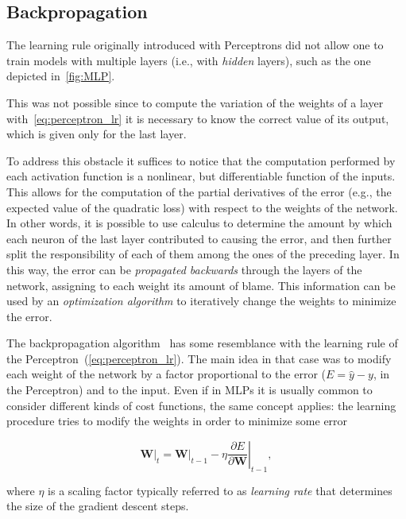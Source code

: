\subsection{Backpropagation}\label{sec:backprop}
The learning rule originally introduced with Perceptrons did not allow one to
train models with multiple layers (i.e., with \emph{hidden} layers), such as
the one depicted in~\autoref{fig:MLP}.

This was not possible since to compute the variation of the weights of a layer
with~\autoref{eq:perceptron_lr} it is necessary to know the correct value of
its output, which is given only for the last layer.

To address this obstacle it suffices to notice that the computation performed
by each activation function is a nonlinear, but differentiable function of the
inputs. This allows for the computation of the partial derivatives of the error
(e.g., the expected value of the quadratic loss) with respect to the weights of
the network. In other words, it is possible to use calculus to determine the
amount by which each neuron of the last layer contributed to causing the error,
and then further split the responsibility of each of them among the ones of the
preceding layer. In this way, the error can be \emph{propagated backwards}
through the layers of the network, assigning to each weight its amount of
blame. This information can be used by an \emph{optimization algorithm} to
iteratively change the weights to minimize the error.

The backpropagation algorithm~\citep[see, e.g.,][]{BP86} has some resemblance
with the learning rule of the Perceptron~(\autoref{eq:perceptron_lr}). The main
idea in that case was to modify each weight of the network by a factor
proportional to the error ($E = \hat y - y$, in the Perceptron) and to the
input. Even if in MLPs it is usually common to consider different kinds of cost
functions, the same concept applies: the learning procedure tries to modify the
weights in order to minimize some error

\begin{equation}
    \mathbf{W}\rvert_t = \mathbf{W}\rvert_{t-1} - \eta \left.\frac{\partial E}
        {\partial \mathbf{W}}\right\rvert_{t-1},
\end{equation}

\noindent where $\eta$ is a scaling factor typically referred to as
\emph{learning rate} that determines the size of the gradient descent steps.

